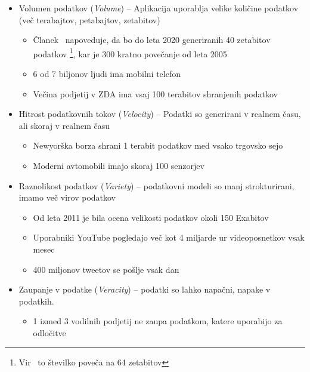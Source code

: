 \begin{itemize} \label{list:four_v}
    \item Volumen podatkov (\emph{Volume}) -- Aplikacija uporablja velike količine podatkov (več terabajtov, petabajtov, zetabitov)
    \begin{itemize}
        \item Članek~\cite{modeling_requirements_big_data} napoveduje, da bo do leta 2020 generiranih 40 zetabitov podatkov 
        \footnote{Vir~\cite{big_data_amount_statista} to številko poveča na 64 zetabitov}, kar je 300 kratno povečanje od leta 2005
        \item 6 od 7 biljonov ljudi ima mobilni telefon
        \item Večina podjetij v ZDA ima vsaj 100 terabitov shranjenih podatkov
    \end{itemize}

    \item Hitrost podatkovnih tokov (\emph{Velocity}) -- Podatki so generirani v realnem času, ali skoraj v realnem času
    \begin{itemize}
        \item Newyorška borza shrani 1 terabit podatkov med vsako trgovsko sejo
        \item Moderni avtomobili imajo skoraj 100 senzorjev
    \end{itemize}
    
    \item Raznolikost podatkov (\emph{Variety}) -- podatkovni modeli so manj strokturirani, imamo več virov podatkov
    \begin{itemize}
        \item Od leta 2011 je bila ocena velikosti podatkov okoli 150 Exabitov
        \item Uporabniki YouTube pogledajo več kot 4 miljarde ur videoposnetkov vsak mesec
        \item 400 miljonov tweetov se pošlje vsak dan 
    \end{itemize}

    \item Zaupanje v podatke (\emph{Veracity}) -- podatki so lahko napačni, napake v podatkih.
    \begin{itemize}
        \item 1 izmed 3 vodilnih podjetij ne zaupa podatkom, katere uporabijo za odločitve 
    \end{itemize}
\end{itemize}

